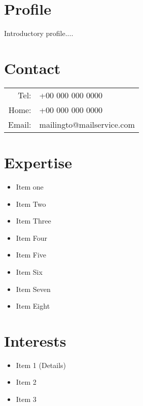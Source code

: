 \documentclass[11pt, oneside, a4paper, titlepage]{article}
\begin{document}
\noindent\begin{tcolorbox}[width=8cm,colback=gray!25,colframe=white]

\section*{Profile}
Introductory profile....

\section*{Contact}
\begin{tabular}{r l}
Tel: & +00 000 000 0000 \\
Home: & +00 000 000 0000 \\
Email: & mailingto@mailservice.com

\end{tabular}

\section*{Expertise}
\begin{itemize}
\item{Item one}
\item{Item Two}
\item{Item Three}
\item{Item Four}
\item{Item Five}
\item{Item Six}
\item{Item Seven}
\item{Item Eight}
\end{itemize}

\section*{Interests}
\begin{itemize}
\item{Item 1 (Details)}
\item{Item 2}
\item{Item 3}
\end{itemize}
\end{tcolorbox}
%
\end{document}
